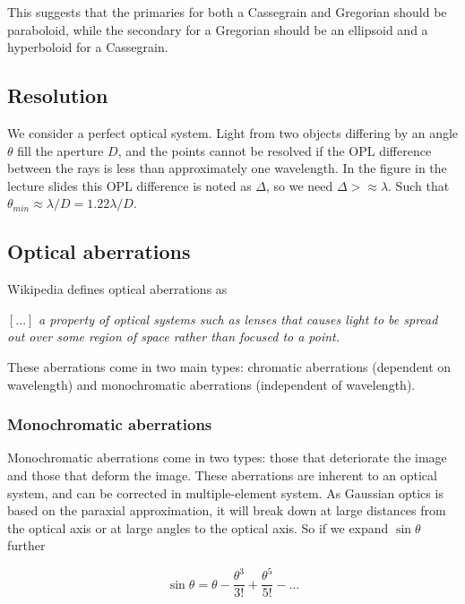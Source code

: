 \documentclass[a4paper]{article}
\begin{document}
This suggests that the primaries for both a Cassegrain and Gregorian should be paraboloid, while the secondary for a Gregorian should be an ellipsoid and a hyperboloid for a Cassegrain.

\subsection{Resolution}

We consider a perfect optical system. Light from two objects differing by an angle $\theta$ fill the aperture $D$, and the points cannot be resolved if the OPL difference between the rays is less than approximately one wavelength. In the figure in the lecture slides this OPL difference is noted as $\Delta$, so we need $\Delta >\approx \lambda$. Such that $\theta_{min}\approx\lambda/D=1.22\lambda/D$.

\subsection{Optical aberrations}

Wikipedia defines optical aberrations as

\begin{displayquote}
    $[...]$ \textit{a property of optical systems such as lenses that causes light to be spread out over some region of space rather than focused to a point.}
\end{displayquote}

These aberrations come in two main types: chromatic aberrations (dependent on wavelength) and monochromatic aberrations (independent of wavelength).

\subsubsection*{Monochromatic aberrations}

Monochromatic aberrations come in two types: those that deteriorate the image and those that deform the image. These aberrations are inherent to an optical system, and can be corrected in multiple-element system. As Gaussian optics is based on the paraxial approximation, it will break down at large distances from the optical axis or at large angles to the optical axis. So if we expand $\sin\theta$ further

\begin{equation*}
    \sin\theta=\theta-\frac{\theta^3}{3!}+\frac{\theta^5}{5!}-\dots
\end{equation*}
\end{document}
